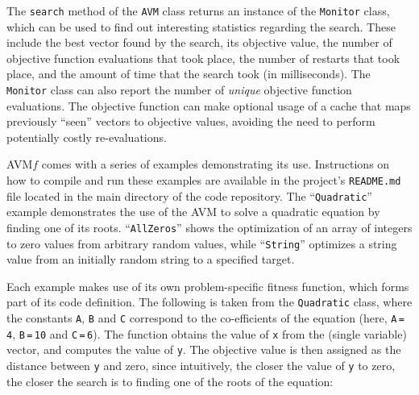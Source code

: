 \documentclass{llncs}
\newcommand{\AVM}{Alternating Variable Method\xspace}
\newcommand{\name}{\mbox{AVM\hspace{-1pt}$f$}\xspace}
\newcommand{\inlineheading}[1]{\vspace{1mm} \noindent {\bf #1.}}
\begin{document}
\begin{sloppypar}
\inlineheading{Reporting} The {\tt search} method of the {\tt AVM} class returns an instance of the {\tt Monitor} class, which can be used to find out interesting statistics regarding the search. These include the best vector found by the search, its objective value, the number of objective function evaluations that took place, the number of restarts that took place, and the amount of time that the search took (in milliseconds). The {\tt Monitor} class can also report the number of {\it unique} objective function evaluations. The objective function can make optional usage of a cache that maps previously ``seen'' vectors to objective values, avoiding the need to perform potentially costly re-evaluations.
\end{sloppypar}

\begin{sloppypar}
\inlineheading{Examples} \name comes with a series of examples demonstrating its use. Instructions on how to compile and run these examples are available in the project's {\tt README.md} file located in the main directory of the code repository. The ``{\tt Quadratic}'' example demonstrates the use of the AVM to solve a quadratic equation by finding one of its roots. ``{\tt AllZeros}'' shows the optimization of an array of integers to zero values from arbitrary random values, while ``{\tt String}'' optimizes a string value from an initially random string to a specified target.
\end{sloppypar}


Each example makes use of its own problem-specific fitness function, which forms part of its code definition. The following is taken from the {\tt Quadratic} class, where the constants {\tt A}, {\tt B} and {\tt C} correspond to the co-efficients of the equation (here, {\tt A}\,{\tt =}\,{\tt 4}, {\tt B}\,{\tt =}\,{\tt 10} and {\tt C}\,{\tt =}\,{\tt 6}). The function obtains the value of {\tt x} from the (single variable) vector, and computes the value of {\tt y}. The objective value is then assigned as the distance between {\tt y} and zero, since intuitively, the closer the value of {\tt y} to zero, the closer the search is to finding one of the roots of the equation:
\end{document}
